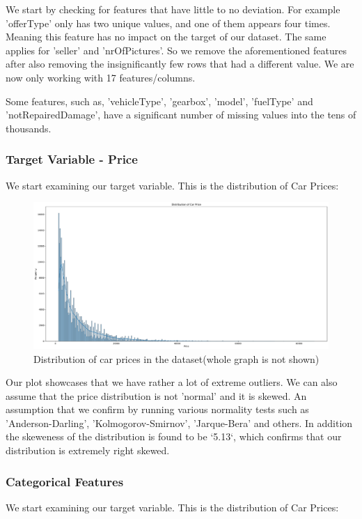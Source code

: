 \documentclass[conference]{IEEEtran}
\begin{document}
We start by checking for features that have little to no deviation. For example
'offerType' only has two unique values, and one of them appears four times.
Meaning this feature has no impact on the target of our dataset. The same
applies for 'seller' and 'nrOfPictures'. So we remove the aforementioned
features after also removing the insignificantly few rows that had a different
value. We are now only working with 17 features/columns.

Some features, such as, 'vehicleType', 'gearbox', 'model', 'fuelType' and
'notRepairedDamage', have a significant number of missing values into the tens
of thousands.

\subsubsection{Target Variable - Price}
We start examining our target variable. This is the distribution of Car Prices:

\begin{figure}[H]
\centering
\includegraphics[trim=0 0 6cm 0, clip, width=\linewidth]{figures/car_price_distribution.pdf}
\caption{Distribution of car prices in the dataset(whole graph is not shown)}
\label{fig:car_price_dist}
\end{figure}

Our plot showcases that we have rather a lot of extreme outliers. We can also
assume that the price distribution is not 'normal' and it is skewed. An
assumption that we confirm by running various normality tests such as
'Anderson-Darling', 'Kolmogorov-Smirnov', 'Jarque-Bera' and others. In addition
the skeweness of the distribution is found to be `5.13`, which confirms that our
distribution is extremely right skewed.

\subsubsection{Categorical Features}
We start examining our target variable. This is the distribution of Car Prices:
\end{document}
